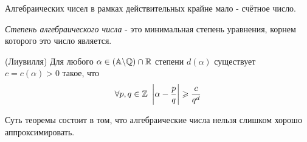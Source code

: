 \begin{note}
	Алгебраических чисел в рамках действительных крайне мало - счётное число.
\end{note}

\begin{definition}
	\textit{Степень алгебраического числа} - это минимальная степень уравнения, корнем которого это число является.
\end{definition}

\begin{theorem} (Лиувилля)
	Для любого $\alpha \in (\mathbb{A} \backslash \mathbb{Q}) \cap \mathbb{R}$ степени $d(\alpha)$ существует $c = c(\alpha) > 0$ такое, что
	\[
		\forall p, q \in \Z\ \left|\alpha - \frac{p}{q}\right| \ge \frac{c}{q^d}
	\]
\end{theorem}

\begin{note}
	Суть теоремы состоит в том, что алгебраические числа нельзя слишком хорошо аппроксимировать.
\end{note}


